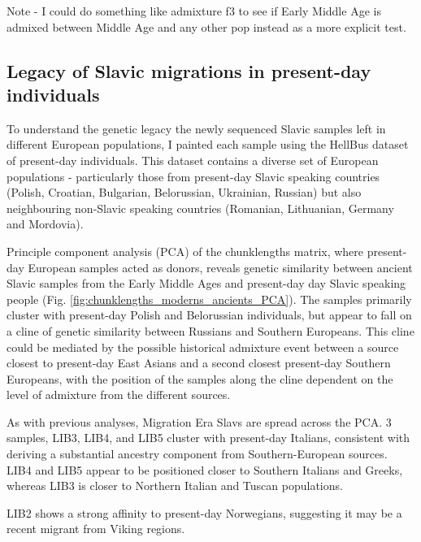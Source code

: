 Note - I could do something like admixture f3 to see if Early Middle Age is admixed between Middle Age and any other pop instead as a more explicit test.

\subsection{Legacy of Slavic migrations in present-day individuals}

To understand the genetic legacy the newly sequenced Slavic samples left in different European populations, I painted each sample using the HellBus dataset of present-day individuals. This dataset contains a diverse set of European populations - particularly those from present-day Slavic speaking countries (Polish, Croatian, Bulgarian, Belorussian, Ukrainian, Russian) but also neighbouring non-Slavic speaking countries (Romanian, Lithuanian, Germany and Mordovia).  

Principle component analysis (PCA) of the chunklengths matrix, where present-day European samples acted as donors, reveals genetic similarity between ancient Slavic samples from the Early Middle Ages and present-day day Slavic speaking people (Fig. \ref{fig:chunklengths_moderns_ancients_PCA}). The samples primarily cluster with present-day Polish and Belorussian individuals, but appear to fall on a cline of genetic similarity between Russians and Southern Europeans. This cline could be mediated by the possible historical admixture event between a source closest to present-day East Asians and a second closest present-day Southern Europeans, with the position of the samples along the cline dependent on the level of admixture from the different sources.

As with previous analyses, Migration Era Slavs are spread across the PCA. 3 samples, LIB3, LIB4, and LIB5 cluster with present-day Italians, consistent with deriving a substantial ancestry component from Southern-European sources. LIB4 and LIB5 appear to be positioned closer to Southern Italians and Greeks, whereas LIB3 is closer to Northern Italian and Tuscan populations. 

LIB2 shows a strong affinity to present-day Norwegians, suggesting it may be a recent migrant from Viking regions. 

